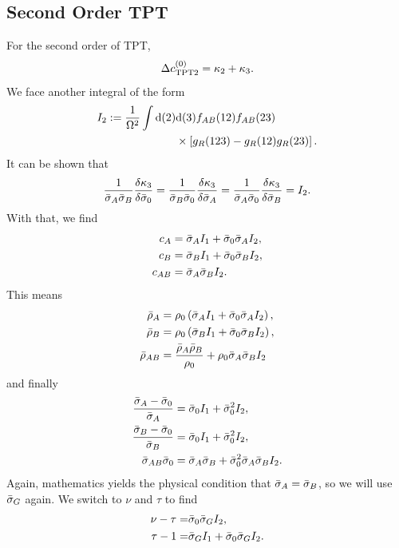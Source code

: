 \documentclass[8.5pt,twoside,twocolumn]{article}
\newcommand\di{\te{d}}
\newcommand\fab{\enmat{f_{AB}}}
\newcommand\roz{\enmat{\rho_0}}
\theoremstyle{standard}
\begin{document}
\subsection{Second Order TPT}
\newcommand\tocc{\dc_{\te{TPT2}}}
For the second order of TPT,
\begin{equation}
\tocc=\kt+\kappa_3.
\end{equation}
We face another integral of the form
\begin{equation}
\begin{aligned}
I_2:=\frac 1 {\Om^2}\int\di(2)&\di(3)\fab(12)\fab(23)\\
&\times\ed{g_R(123)-g_R(12)g_R(23)}.
\end{aligned}
\end{equation}
It can be shown that
\begin{equation}
\frac{1}{\bar\sigma_A\bar\sigma_B}\frac {\delta{\kappa_3}} {\delta{\bar\sigma_{0}}}=\frac{1}{\bar\sigma_B\bar\sigma_{0}}\frac {\delta{\kappa_3}} {\delta{\bar\sigma_{A}}}
=\frac{1}{\bar\sigma_A\bar\sigma_{0}}\frac {\delta{\kappa_3}} {\delta{\bar\sigma_{B}}}=I_2.
\end{equation} 
With that, we find
\begin{equation}
\begin{aligned}
c_A&=\bar\sigma_A I_1+\bar\sigma_0\bar\sigma_A I_2, \\
c_B&=\bar\sigma_B I_1+\bar\sigma_0\bar\sigma_B I_2, \\
c_{AB}&=\bar\sigma_A\bar\sigma_B I_2.
\end{aligned}
\end{equation}
This means
\begin{equation}
\begin{aligned}
\tr_A&=\roz\rb{\si_A I_1+\siz\si_A I_2}, \\
\tr_B&=\roz\rb{\si_B I_1+\siz\si_B I_2}, \\
\tr_{AB}&=\frac {\tr_A\tr_B}{\roz}+\roz\sia\sib I_2
\end{aligned}
\end{equation}
and finally
\begin{equation}
\begin{aligned}
\frac{\bar\sigma_A-\bar\sigma_0}{\bar\sigma_A}&=\bar\sigma_0 I_1+\bar\sigma_0^2 I_2,\\
\frac{\bar\sigma_B-\bar\sigma_0}{\bar\sigma_B}&=\bar\sigma_0 I_1+\bar\sigma_0^2 I_2,\\
\bar\sigma_{AB}\bar\sigma_0&=\bar\sigma_A\bar\sigma_B+\bar\sigma_0^2\bar\sigma_A\bar\sigma_B I_2.
\end{aligned}
\label{TPT2:sigmas}
\end{equation}
Again, mathematics yields the physical condition that $\bar\sigma_A=\bar\sigma_B$, so we will
use $\bar\sigma_G$ again. We switch to $\nu$ and $\tau$ to find
\begin{equation}
\begin{aligned}
\nu-\tau=&\bar\sigma_0\bar\sigma_G I_2,\\
\tau-1=&\bar\sigma_G I_1+\bar\sigma_0\bar\sigma_G I_2.
\end{aligned}
\label{TPT2:tau,nu}
\end{equation}
\end{document}
